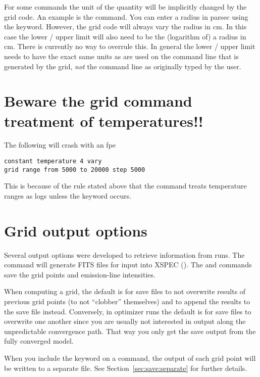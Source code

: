For some commands the unit of the quantity will be implicitly changed by the
grid code. An example is the  command. You can enter a
radius in parsec using the  keyword. However, the grid code
will always vary the radius in cm. In this case the lower / upper limit will
also need to be the (logarithm of) a radius in cm. There is currently no way
to overrule this. In general the lower / upper limit needs to have the exact
same units as are used on the command line that is generated by the grid,
\emph{not} the command line as originally typed by the user.

\section{Beware the grid command treatment of temperatures!!}
\label{sec:GridTemperatureGotcha}
The following will crash with an fpe
\begin{verbatim}
constant temperature 4 vary
grid range from 5000 to 20000 step 5000
\end{verbatim}
This is because of the rule stated above that the  command
treats temperature ranges as logs unless the keyword
 occurs.  

\section{Grid output options}
\label{sec:GridOutputOptions}

Several  output
options were developed to
retrieve information from  runs.
The  command
will generate FITS files for input into XSPEC (\citealp{Porter2006}).
The
 and  commands
save the grid points and emission-line intensities.

When computing a grid, the default is for save files to not overwrite
results of previous grid points (to not ``clobber'' themselves) and
to append the results to the save file instead.
Conversely, in optimizer runs the default
is for save files to overwrite one another since you
are usually not interested in output along the unpredictable convergence path.
That way you only get the save output from the fully converged model.

When you include the  keyword on a 
command, the output of each grid point will be written to a separate file. See
Section~\ref{sec:save:separate} for further details.

